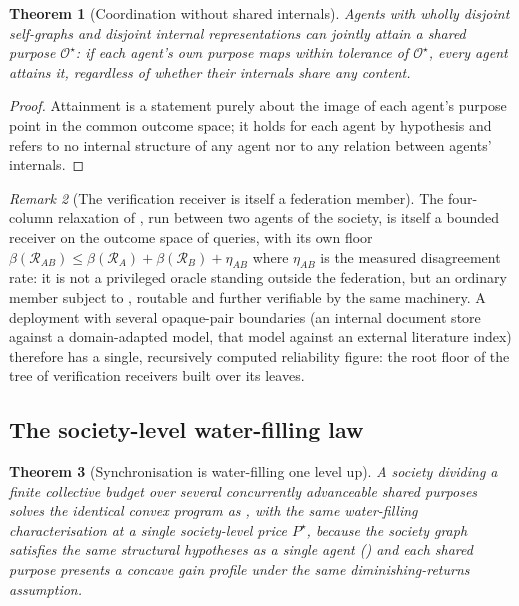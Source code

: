 \documentclass[11pt,twocolumn,a4paper]{article}
\theoremstyle{frathm}
\newtheorem{theorem}{Theorem}[section]
\theoremstyle{definition}
\theoremstyle{remark}
\newtheorem{remark}[theorem]{Remark}
\newcommand{\flo}{\beta}
\newcommand{\Rec}{\mathcal{R}}
\newcommand{\Out}{\mathcal{O}}
\begin{document}
\begin{theorem}[Coordination without shared internals]
\label{thm:coord}
Agents with wholly disjoint self-graphs and disjoint internal
representations can jointly attain a shared purpose $\Out^{\star}$: if
each agent's own purpose maps within tolerance of $\Out^{\star}$, every
agent attains it, regardless of whether their internals share any
content.
\end{theorem}

\begin{proof}
Attainment is a statement purely about the image of each agent's purpose
point in the common outcome space; it holds for each agent by hypothesis
and refers to no internal structure of any agent nor to any relation
between agents' internals.
\end{proof}

\begin{remark}[The verification receiver is itself a federation member]
\label{rem:verifier-is-receiver}
The four-column relaxation of , run between two
agents of the society, is itself a bounded receiver on the outcome space
of queries, with its own floor $\flo(\Rec_{AB})\le\flo(\Rec_A)+
\flo(\Rec_B)+\eta_{AB}$ where $\eta_{AB}$ is the measured disagreement
rate: it is not a privileged oracle standing outside the federation, but
an ordinary member subject to , routable and further
verifiable by the same machinery. A deployment with several opaque-pair
boundaries (an internal document store against a domain-adapted model,
that model against an external literature index) therefore has a single,
recursively computed reliability figure: the root floor of the tree of
verification receivers built over its leaves.
\end{remark}

\subsection{The society-level water-filling law}

\begin{theorem}[Synchronisation is water-filling one level up]
\label{thm:socwaterfill}
A society dividing a finite collective budget over several concurrently
advanceable shared purposes solves the identical convex program as
, with the same water-filling characterisation at a
single society-level price $P^{\star}$, because the society graph
satisfies the same structural hypotheses as a single agent
() and each shared purpose presents a concave
gain profile under the same diminishing-returns assumption.
\end{theorem}
\end{document}
